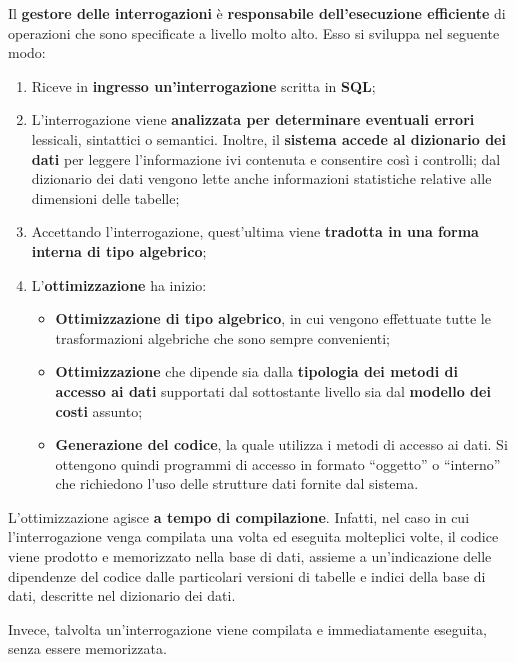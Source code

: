 \documentclass[a4paper]{article}
\newcommand{\dquotes}[1]{``#1''}
\begin{document}
	Il \textcolor{Red3}{\textbf{gestore delle interrogazioni}} è \textbf{responsabile dell'esecuzione efficiente} di operazioni che sono specificate a livello molto alto. Esso si sviluppa nel seguente modo:
	\begin{enumerate}
		\item Riceve in \textbf{ingresso un'interrogazione} scritta in \textbf{SQL};
		
		\item L'interrogazione viene \textbf{analizzata per determinare eventuali errori} lessicali, sintattici o semantici. Inoltre, il \textbf{sistema accede al dizionario dei dati} per leggere l'informazione ivi contenuta e consentire così i controlli; dal dizionario dei dati vengono lette anche informazioni statistiche relative alle dimensioni delle tabelle;
		
		\item Accettando l'interrogazione, quest'ultima viene \textbf{tradotta in una forma interna di tipo algebrico};
		
		\item L'\textbf{ottimizzazione} ha inizio:
		\begin{itemize}
			\item \textbf{Ottimizzazione di tipo algebrico}, in cui vengono effettuate tutte le trasformazioni algebriche che sono sempre convenienti;
			
			\item \textbf{Ottimizzazione} che dipende sia dalla \textbf{tipologia dei metodi di accesso ai dati} supportati dal sottostante livello sia dal \textbf{modello dei costi} assunto;
			
			\item \textbf{Generazione del codice}, la quale utilizza i metodi di accesso ai dati. Si ottengono quindi programmi di accesso in formato \dquotes{oggetto} o \dquotes{interno} che richiedono l'uso delle strutture dati fornite dal sistema.
		\end{itemize}
	\end{enumerate}
	L'ottimizzazione agisce \textbf{a tempo di compilazione}. Infatti, nel caso in cui l'interrogazione venga compilata una volta ed eseguita molteplici volte, il codice viene prodotto e memorizzato nella base di dati, assieme a un'indicazione delle dipendenze del codice dalle particolari versioni di tabelle e indici della base di dati, descritte nel dizionario dei dati.
	
	Invece, talvolta un'interrogazione viene compilata e immediatamente eseguita, senza essere memorizzata.\newpage
	
\end{document}
